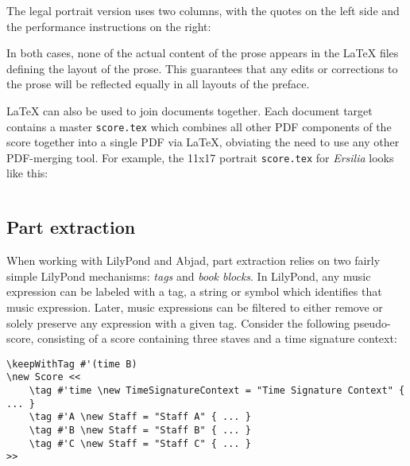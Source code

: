 \noindent The legal portrait version uses two columns, with the quotes on the
left side and the performance instructions on the right:


\noindent In both cases, none of the actual content of the prose appears in the
LaTeX files defining the layout of the prose. This guarantees that any edits or
corrections to the prose will be reflected equally in all layouts of the
preface.

LaTeX can also be used to join documents together. Each document target
contains a master \texttt{score.tex} which combines all other PDF components of
the score together into a single PDF via LaTeX, obviating the need to use any
other PDF-merging tool. For example, the 11x17 portrait \texttt{score.tex} for
\emph{Ersilia} looks like this:

\begin{singlespacing}
\vspace{-0.5\baselineskip}
\inputminted{tex}{../../Documents/Scores/ersilia/ersilia/build/11x17-portrait/ersilia-11x17-portrait-score.tex}
\end{singlespacing}

\subsection{Part extraction}
\label{ssec:part-extraction}

When working with LilyPond and Abjad, part extraction relies on two fairly
simple LilyPond mechanisms: \emph{tags} and \emph{book blocks}. In LilyPond,
any music expression can be labeled with a tag, a string or symbol which
identifies that music expression. Later, music expressions can be filtered to
either remove or solely preserve any expression with a given tag. Consider the
following pseudo-score, consisting of a score containing three staves and a
time signature context:

\begin{singlespacing}
\vspace{-0.5\baselineskip}
\begin{verbatim}
\keepWithTag #'(time B)
\new Score <<
    \tag #'time \new TimeSignatureContext = "Time Signature Context" { ... }
    \tag #'A \new Staff = "Staff A" { ... }
    \tag #'B \new Staff = "Staff B" { ... }
    \tag #'C \new Staff = "Staff C" { ... }
>>
\end{verbatim}
\end{singlespacing}

